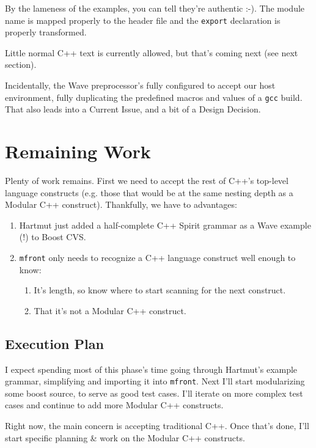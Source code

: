 \documentclass[leqno,fleqn, twocolumn]{article}
\begin{document}
By the lameness of the examples, you can tell they're authentic :-).  The module name is mapped properly to the header file and the \texttt{export} declaration is properly transformed. 

Little normal C++ text is currently allowed, but that's coming next (see next section).

Incidentally, the Wave preprocessor's fully configured to accept our host environment, fully duplicating the predefined macros and values of a \texttt{gcc} build.  That also leads into a Current Issue, and a bit of a Design Decision.

\section{Remaining Work}
Plenty of work remains.  First we need to accept the rest of C++'s top-level language constructs (e.g. those that would be at the same nesting depth as a Modular C++ construct).  Thankfully, we have to advantages:
\begin{enumerate}
\item Hartmut just added a half-complete C++ Spirit grammar as a Wave example (!) to Boost CVS.
\item \texttt{mfront} only needs to recognize a C++ language construct well enough to know:
	\begin{enumerate}
	\item It's length, so know where to start scanning for the next construct.
	\item That it's not a Modular C++ construct.
	\end{enumerate}
\end{enumerate}

\subsection{Execution Plan}
I expect spending most of this phase's time going through Hartmut's example grammar, simplifying and importing it into \texttt{mfront}.  Next I'll start modularizing some boost source, to serve as good test cases.  I'll iterate on more complex test cases and continue to add more Modular C++ constructs.

Right now, the main concern is accepting traditional C++.  Once that's done, I'll start specific planning \& work on the Modular C++ constructs.
\end{document}
